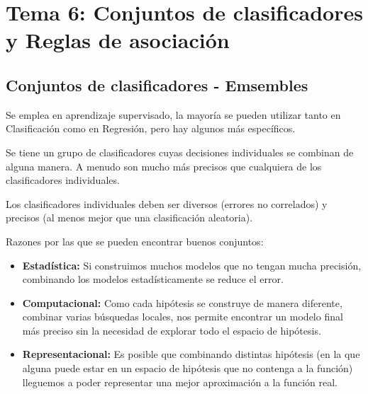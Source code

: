 \documentclass[12pt, twoside, openright]{report} %
\begin{document}
\chapter{Tema 6: Conjuntos de clasificadores y Reglas de asociación}
\section{Conjuntos de clasificadores - Emsembles}
Se emplea en aprendizaje supervisado, la mayoría se pueden utilizar tanto en Clasificación como en Regresión, pero hay algunos más específicos.

Se tiene un grupo de clasificadores cuyas decisiones individuales se combinan de alguna manera. A menudo son mucho más precisos que cualquiera de los clasificadores individuales.

Los clasificadores individuales deben ser diversos (errores no correlados) y precisos (al menos mejor que una clasificación aleatoria).

Razones por las que se pueden encontrar buenos conjuntos:
\begin{itemize}
	\item \textbf{Estadística:} Si construimos muchos modelos que no tengan mucha precisión, combinando los modelos estadísticamente se reduce el error.
	\item \textbf{Computacional:} Como cada hipótesis se construye de manera diferente, combinar varias búsquedas locales, nos permite encontrar un modelo final más preciso sin la necesidad de explorar todo el espacio de hipótesis.
	\item \textbf{Representacional:} Es posible que combinando distintas hipótesis (en la que alguna puede estar en un espacio de hipótesis que no contenga a la función) lleguemos a poder representar una mejor aproximación a la función real.
\end{itemize}
\end{document}
